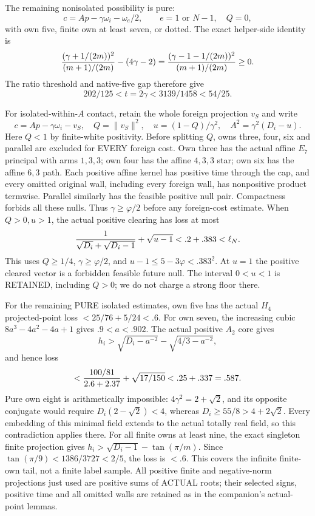 The remaining nonisolated possibility is pure:
\[
 c=Ap-\gamma\omega_i-\omega_e/2,\qquad
 e=1\text{ or }N-1,\quad Q=0,
\]
with own five, finite own at least seven, or dotted.
The exact helper-side identity is
\[
 {(\gamma+1/(2m))^2\over(m+1)/(2m)}-(4\gamma-2)
 ={(\gamma-1-1/(2m))^2\over(m+1)/(2m)}\ge0.
\]
The ratio threshold and native-five gap therefore give
\[
             202/125<t=2\gamma<3139/1458<54/25.
\tag{Astrip}\label{eq:arithAhelperphysical}
\]

For isolated-within-\(A\) contact, retain the whole foreign
projection \(v_S\) and write
\[
 c=Ap-\gamma\omega_i-v_S,\quad Q=\|v_S\|^2,\quad
 u=(1-Q)/\gamma^2,\quad A^2=\gamma^2(D_i-u).
\]
Here \(Q<1\) by finite-white positivity.
Before splitting \(Q\), owns three, four, six and parallel
are excluded for EVERY foreign cost.
Own three has the actual affine \(E_7\) principal with arms
\(1,3,3\); own four has the affine \(4,3,3\) star;
own six has the affine \(6,3\) path.
Each positive affine kernel has positive time through the cap,
and every omitted original wall, including every foreign wall,
has nonpositive product termwise.
Parallel similarly has the feasible positive null pair.
Compactness forbids all these nulls.
Thus \(\gamma\ge\varphi/2\) before any foreign-cost estimate.
When \(Q>0,u>1\), the actual positive clearing has loss at most
\[
 {1\over\sqrt{D_i}+\sqrt{D_i-1}}+\sqrt{u-1}
 <.2+.383<\ell_N .
\]
This uses \(Q\ge1/4\), \(\gamma\ge\varphi/2\), and
\(u-1\le5-3\varphi<.383^2\).
At \(u=1\) the positive cleared vector is a forbidden feasible
future null.
The interval \(0<u<1\) is RETAINED, including \(Q>0\);
we do not charge a strong floor there.

For the remaining PURE isolated estimates, own five has the
actual \(H_4\) projected-point loss
\(<25/76+5/24<.6\).
For own seven, the increasing cubic
\(8a^3-4a^2-4a+1\) gives \(.9<a<.902\).
The actual positive \(A_2\) core gives
\[
 h_i>\sqrt{D_i-a^{-2}}-\sqrt{4/3-a^{-2}},
\]
and hence loss
\[
 <{100/81\over2.6+2.37}+\sqrt{17/150}
 <.25+.337=.587 .
\]
Pure own eight is arithmetically impossible:
\(4\gamma^2=2+\sqrt2\), and its opposite conjugate would require
\(D_i(2-\sqrt2)<4\), whereas
\(D_i\ge55/8>4+2\sqrt2\).
Every embedding of this minimal field extends to the actual
totally real field, so this contradiction applies there.
For all finite owns at least nine, the exact singleton finite
projection gives
\(h_i>\sqrt{D_i-1}-\tan(\pi/m)\).
Since \(\tan(\pi/9)<1386/3727<2/5\), the loss is \(<.6\).
This covers the infinite finite-own tail, not a finite label sample.
All positive finite and negative-norm projections just used are
positive sums of ACTUAL roots; their selected signs, positive
time and all omitted walls are retained as in the companion's
actual-point lemmas.

